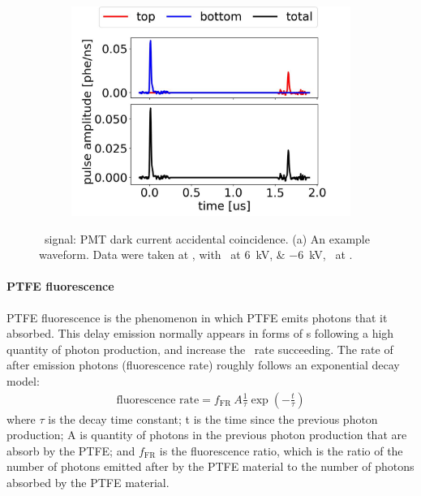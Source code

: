 \begin{figure}[!p]
	\centering
	\begin{subfigure}[b]{0.7\textwidth}
		\centering
		\includegraphics[width=\figurewidth,clip,trim={0 0 0 0}]{Figures/GasTest/exampleWaveforms/proc64767id00000053.jpg}%
		\caption{}
		\label{fig:}
	\end{subfigure}
	\caption[\gtest\ signal: PMT dark current accidental coincidence.]{\gtest\ signal: PMT dark current accidental coincidence. (a) An example waveform. Data were taken at , with \opvtvb\ at \SIlist{+6;-6}{kV}, \opgd\ at \standarddensity .%
	}
	\label{fig:pmt dark current}
\end{figure}


\paragraph{PTFE fluorescence}
\label{sec:events PTFE fluo}
PTFE fluorescence is the phenomenon in which PTFE emits photons that it absorbed. This delay emission normally appears in forms of \sphe s following a high quantity of photon production, and increase the \sphe\ rate succeeding. The rate of after emission photons (fluorescence rate) roughly follows an exponential decay model:
\begin{align}
	 \text{fluorescence rate} = f_{\text{FR}}\ A\frac{1}{\tau} \exp \left( -\frac{t}{\tau} \right) 
\end{align} 
where $\tau$ is the decay time constant; t is the time since the previous photon production; A is quantity of photons in the previous photon production that are absorb by the PTFE; and $f_{\text{FR}}$ is the fluorescence ratio, which is the ratio of the number of photons emitted after by the PTFE material to the number of photons absorbed by the PTFE material.

